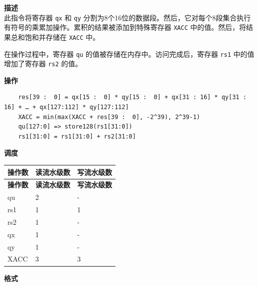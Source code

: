 \textbf{描述}\\
此指令将寄存器 \lstinline{qx} 和 \lstinline{qy} 分割为8个16位的数据段。然后，它对每个8段集合执行有符号的乘累加操作。累积的结果被添加到特殊寄存器 \lstinline{XACC} 中的值。然后，将结果总和饱和并存储在 \lstinline{XACC} 中。

在操作过程中，寄存器 \lstinline{qu} 的值被存储在内存中。访问完成后，寄存器 \lstinline{rs1} 中的值增加了寄存器 \lstinline{rs2} 的值。

\textbf{操作}\\
\begin{lstlisting}
    res[39 :  0] = qx[15 :  0] * qy[15 :  0] + qx[31 : 16] * qy[31 : 16] + … + qx[127:112] * qy[127:112]
    XACC = min(max(XACC + res[39 :  0], -2^39), 2^39-1)
    qu[127:0] => store128(rs1[31:0])
    rs1[31:0] = rs1[31:0] + rs2[31:0]
\end{lstlisting}

\textbf{调度}\\
\begin{longtable}[c]{|l|l|l|}
    \hline
    \rowcolor{lightgray}
    \textbf{操作数} & \textbf{读流水级数} & \textbf{写流水级数} \\\hline
    \endfirsthead
    \hline
    \rowcolor{lightgray}
     \textbf{操作数} & \textbf{读流水级数} & \textbf{写流水级数} \\\hline
    \endhead
    \hline
    \endfoot

    qu & 2 & - \\\hline
    rs1 & 1 & 1 \\\hline
    rs2 & 1 & - \\\hline
     qx & 1 & - \\\hline
     qy & 1 & - \\\hline
     XACC & 3 & 3

\end{longtable}

\textbf{格式}\\


